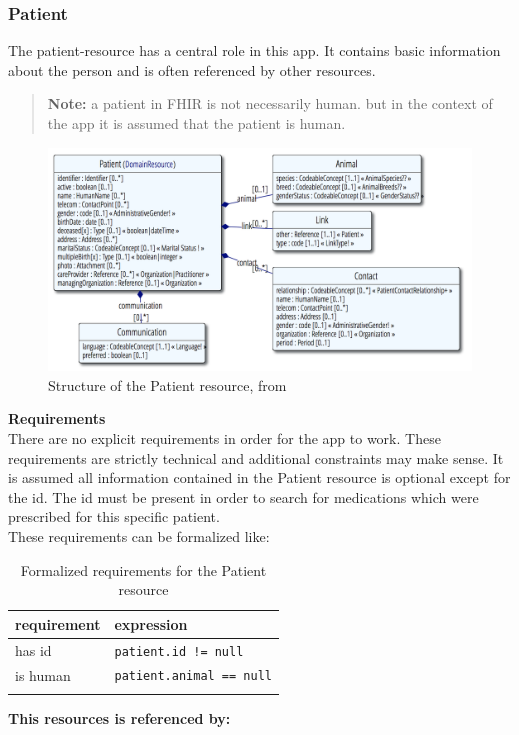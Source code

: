 \documentclass{article}
\begin{document}
\subsubsection{Patient}\label{res:patient}
The patient-resource has a central role in this app. It contains basic
information about the person and is often referenced by other resources.
\begin{quote}
\textbf{Note:} a patient in FHIR is not necessarily human. but in the
context of the app it is assumed that the patient is human.
\end{quote}
\begin{figure}[H]
\centering
\includegraphics[width=\linewidth]{resources/FHIR/Patient.png}
\caption{Structure of the Patient resource, from \citep{res-patient}}
\label{fig:structure-patient}
\end{figure}
\textbf{Requirements}\label{res:patient:requirements}
\\
There are no explicit requirements in order for the app to work.
These requirements are strictly technical and additional constraints may make sense.
It is assumed all information contained in the Patient resource is optional except for the id.
The id must be present in order to search for medications which were prescribed for this specific patient.
\\
These requirements can be formalized like:
\\
\begin{longtable}[]{@{}ll@{}}
\toprule
requirement & expression\tabularnewline
\midrule
has id & \texttt{patient.id != null}\tabularnewline
is human & \texttt{patient.animal == null}\tabularnewline
\bottomrule
\caption{Formalized requirements for the Patient resource}
\end{longtable}
\textbf{This resources is referenced by:}\label{res:patient:referenced-by}
\\
\end{document}
